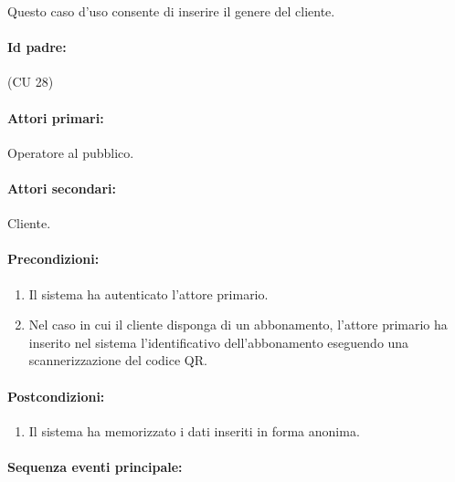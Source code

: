 \documentclass{article}
\begin{document}
	\indent\indent Questo caso d'uso consente di inserire il genere del cliente.
	
	\paragraph{Id padre:} (CU 28)
	
	\paragraph{Attori primari:}Operatore al pubblico.
	
	\paragraph{Attori secondari:}Cliente.
	
	\paragraph{Precondizioni:}
	\begin{enumerate}[itemsep=8pt,parsep=0pt]
		\item Il sistema ha autenticato l'attore primario.
		\item Nel caso in cui il cliente disponga di un abbonamento, l'attore primario ha inserito nel sistema l'identificativo dell'abbonamento eseguendo una scannerizzazione del codice QR.
	\end{enumerate}

	\paragraph{Postcondizioni:}
	\begin{enumerate}[itemsep=8pt,parsep=0pt]
		\item Il sistema ha memorizzato i dati inseriti in forma anonima.
	\end{enumerate}
	
	\paragraph{Sequenza eventi principale:}
\end{document}
